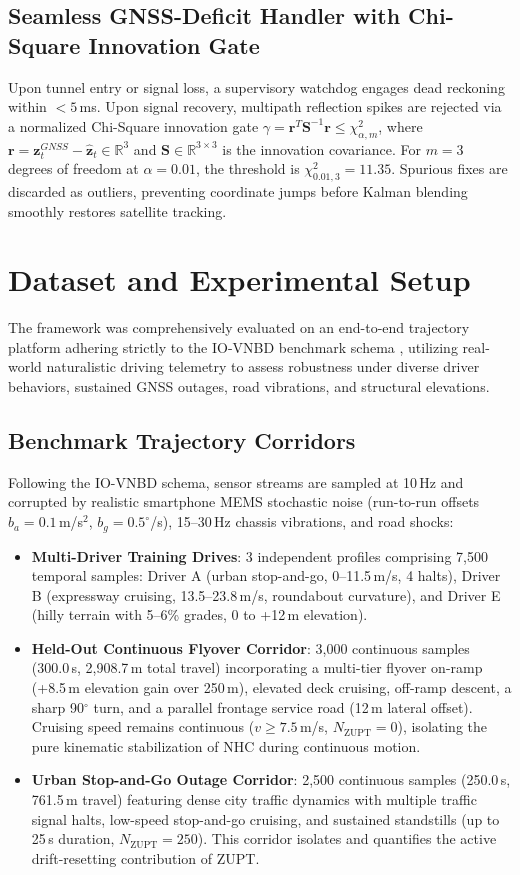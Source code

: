 \documentclass[conference]{IEEEtran}
\begin{document}
\subsection{Seamless GNSS-Deficit Handler with Chi-Square Innovation Gate}
Upon tunnel entry or signal loss, a supervisory watchdog engages dead reckoning within $<5$\,ms. Upon signal recovery, multipath reflection spikes are rejected via a normalized Chi-Square innovation gate $\gamma = \mathbf{r}^T\mathbf{S}^{-1}\mathbf{r} \leq \chi^2_{\alpha,m}$, where $\mathbf{r} = \mathbf{z}_t^{GNSS} - \hat{\mathbf{z}}_t \in \mathbb{R}^3$ and $\mathbf{S} \in \mathbb{R}^{3\times 3}$ is the innovation covariance. For $m=3$ degrees of freedom at $\alpha = 0.01$, the threshold is $\chi^2_{0.01, 3} = 11.35$. Spurious fixes are discarded as outliers, preventing coordinate jumps before Kalman blending smoothly restores satellite tracking.

\section{Dataset and Experimental Setup}

The framework was comprehensively evaluated on an end-to-end trajectory platform adhering strictly to the IO-VNBD benchmark schema \cite{onyekpe2021}, utilizing real-world naturalistic driving telemetry to assess robustness under diverse driver behaviors, sustained GNSS outages, road vibrations, and structural elevations.

\subsection{Benchmark Trajectory Corridors}
Following the IO-VNBD schema, sensor streams are sampled at 10\,Hz and corrupted by realistic smartphone MEMS stochastic noise (run-to-run offsets $b_a = 0.1$\,m/s$^2$, $b_g = 0.5^\circ$/s), 15--30\,Hz chassis vibrations, and road shocks:
\begin{itemize}
\item \textbf{Multi-Driver Training Drives}: 3 independent profiles comprising 7,500 temporal samples: Driver A (urban stop-and-go, 0--11.5\,m/s, 4 halts), Driver B (expressway cruising, 13.5--23.8\,m/s, roundabout curvature), and Driver E (hilly terrain with 5--6\% grades, 0 to +12\,m elevation).
\item \textbf{Held-Out Continuous Flyover Corridor}: 3,000 continuous samples (300.0\,s, 2{,}908.7\,m total travel) incorporating a multi-tier flyover on-ramp (+8.5\,m elevation gain over 250\,m), elevated deck cruising, off-ramp descent, a sharp 90$^\circ$ turn, and a parallel frontage service road (12\,m lateral offset). Cruising speed remains continuous ($v \ge 7.5$\,m/s, $N_{\text{ZUPT}}=0$), isolating the pure kinematic stabilization of NHC during continuous motion.
\item \textbf{Urban Stop-and-Go Outage Corridor}: 2,500 continuous samples (250.0\,s, 761.5\,m travel) featuring dense city traffic dynamics with multiple traffic signal halts, low-speed stop-and-go cruising, and sustained standstills (up to 25\,s duration, $N_{\text{ZUPT}}=250$). This corridor isolates and quantifies the active drift-resetting contribution of ZUPT.
\end{itemize}
\end{document}

